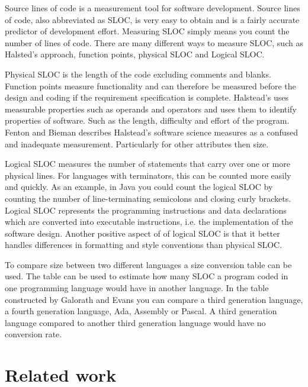 Source lines of code is a measurement tool for software development. Source lines of code, also abbreviated as SLOC, is very easy to obtain and is a fairly accurate predictor of development effort\cite[p.~63]{galorath2006}. Measuring SLOC simply means you count the number of lines of code. There are many different ways to measure SLOC, such as Halsted’s approach, function points, physical SLOC and Logical SLOC. 

Physical SLOC is the length of the code excluding comments and blanks. Function points measure functionality and can therefore be measured before the design and coding if the requirement specification is complete\cite[p.~187]{galorath2006}. Halstead’s uses measurable properties such as operands and operators and uses them to identify properties of software. Such as the length, difficulty and effort of the program. Fenton and Bieman describes Halstead’s software science measures as a confused and inadequate measurement. Particularly for other attributes then size\cite[p.~345]{fenton2015}.

Logical SLOC measures the number of statements that carry over one or more physical lines.  For languages with terminators, this can be counted more easily and quickly. As an example, in Java you could count the logical SLOC by counting the number of line-terminating semicolons and closing curly brackets. Logical SLOC represents the programming instructions and data declarations which are converted into executable instructions, i.e. the implementation of the software design. Another positive aspect of of logical SLOC is that it better handles differences in formatting and style conventions than physical SLOC\cite[p.~155]{galorath2006}.

To compare size between two different languages a size conversion table can be used. The table can be used to estimate how many SLOC a program coded in one programming language would have in another language. In the table constructed by Galorath and Evans you can compare a third generation language, a fourth generation language, Ada, Assembly or Pascal\cite[p.~163]{galorath2006}. A third generation language compared to another third generation language would have no conversion rate. 

\section{Related work}


